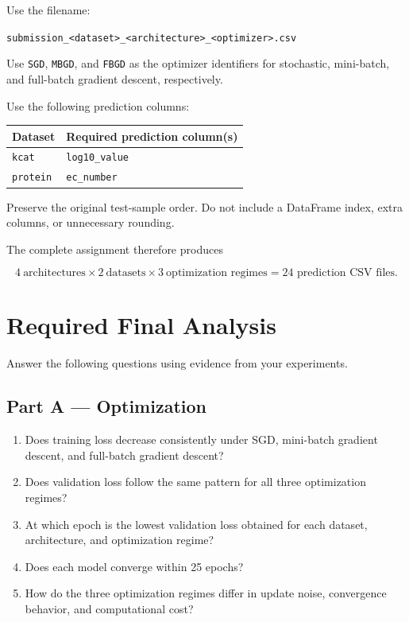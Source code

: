 \documentclass[11pt,a4paper]{article}
\newcommand{\code}[1]{\texttt{#1}}
\begin{document}
Use the filename:

\begin{center}
\code{submission\_<dataset>\_<architecture>\_<optimizer>.csv}
\end{center}

Use \code{SGD}, \code{MBGD}, and \code{FBGD} as the optimizer identifiers for stochastic, mini-batch, and full-batch gradient descent, respectively.

Use the following prediction columns:

\begin{center}
\begin{tabular}{ll}
\toprule
\textbf{Dataset} & \textbf{Required prediction column(s)} \\
\midrule
\code{kcat} & \code{log10\_value} \\
\code{protein} & \code{ec\_number} \\
\bottomrule
\end{tabular}
\end{center}

Preserve the original test-sample order. Do not include a DataFrame index, extra columns, or unnecessary rounding.

The complete assignment therefore produces

\[
4\ \text{architectures}\times2\ \text{datasets}\times3\ \text{optimization regimes}
=\boxed{24\text{ prediction CSV files}}.
\]

\section{Required Final Analysis}

Answer the following questions using evidence from your experiments.

\subsection*{Part A --- Optimization}

\begin{enumerate}
    \item Does training loss decrease consistently under SGD, mini-batch gradient descent, and full-batch gradient descent?
    \item Does validation loss follow the same pattern for all three optimization regimes?
    \item At which epoch is the lowest validation loss obtained for each dataset, architecture, and optimization regime?
    \item Does each model converge within 25 epochs?
    \item How do the three optimization regimes differ in update noise, convergence behavior, and computational cost?
\end{enumerate}
\end{document}
